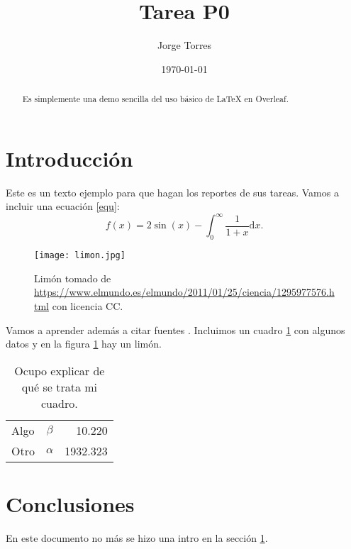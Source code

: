 \documentclass{article}
\title{Tarea P0} %
\author{Jorge Torres} %
\date{\today}
\begin{document}

\maketitle %

\begin{abstract} %
  Es simplemente una demo sencilla del uso b\'{a}sico de \LaTeX{} en
  Overleaf.
\end{abstract}

\section{Introducci\'{o}n}\label{intro} %



Este es un texto ejemplo para que hagan los reportes de sus
tareas. Vamos a incluir una ecuaci\'{o}n \eqref{equ}:
\begin{equation}
  f(x) = 2 \sin(x) - \int_0^\infty \frac{1}{1 + x} \text{d}x.
  \label{equ}
\end{equation}

\begin{figure} %
    \centering
    \texttt{[image: limon.jpg]} %
    \caption{Lim\'{o}n tomado de \url{https://www.elmundo.es/elmundo/2011/01/25/ciencia/1295977576.html} con licencia CC.}
    \label{limon}
\end{figure}

\newpage

Vamos a aprender adem\'{a}s a citar fuentes \citep{ejemplo}. Incluimos un
cuadro \ref{datos} con algunos datos y en la figura \ref{limon} hay un
lim\'{o}n.

\begin{table} %
    \caption{Ocupo explicar de qu\'{e} se trata mi cuadro.} %
    \label{datos} %
    \centering %
    \begin{tabular}{l|cr} %
         Algo & $\beta$ & 10.220 \\
         Otro & $\alpha$ & 1932.323
    \end{tabular}
\end{table}

\section{Conclusiones}

En este documento no m\'{a}s se hizo una intro en la secci\'{o}n \ref{intro}.



\end{document}
